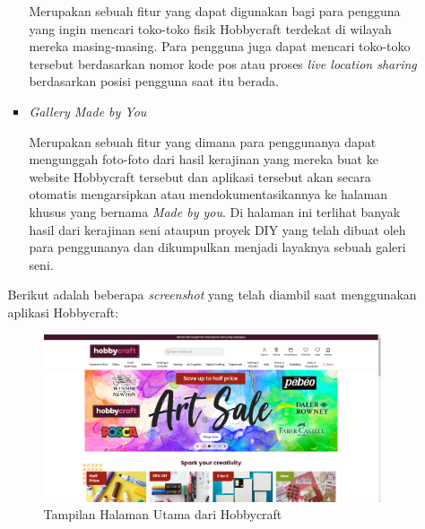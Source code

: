 \documentclass[a4paper]{article}
\begin{document}
\begin{itemize}
\begin{enumerate}
\begin{itemize}
            Merupakan sebuah fitur yang dapat digunakan bagi para pengguna yang ingin mencari toko-toko fisik Hobbycraft terdekat di wilayah mereka masing-masing. Para pengguna juga dapat mencari toko-toko tersebut berdasarkan nomor kode pos atau proses \textit{live location sharing} berdasarkan posisi pengguna saat itu berada\autocite{hobbycraft-finders}.

            \item \textit{Gallery Made by You}
            
            Merupakan sebuah fitur yang dimana para penggunanya dapat mengunggah foto-foto dari hasil kerajinan yang mereka buat ke website Hobbycraft tersebut dan aplikasi tersebut akan secara otomatis mengarsipkan atau mendokumentasikannya ke halaman khusus yang bernama \textit{Made by you}. Di halaman ini terlihat banyak hasil dari kerajinan seni ataupun proyek DIY yang telah dibuat oleh para penggunanya dan dikumpulkan menjadi layaknya sebuah galeri seni\autocite{hobbycraft-gallery}.

        \end{itemize}
        \newpage
        Berikut adalah beberapa \textit{screenshot} yang telah diambil saat menggunakan aplikasi Hobbycraft:

        \begin{figure}[h]
            \centering
            \includegraphics[scale=0.25]{images/ss hobbycraft/Homepage Hobbycraft.png}
            \caption{Tampilan Halaman Utama dari Hobbycraft}
        \end{figure}
        

\end{enumerate}
\end{itemize}
\end{document}
